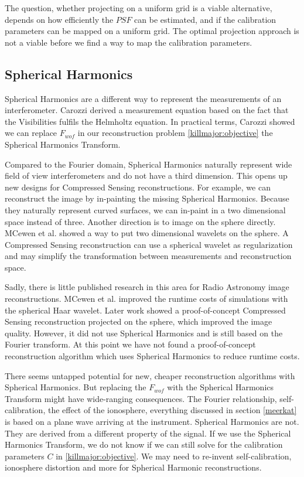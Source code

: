 The question, whether projecting on a uniform grid is a viable alternative, depends on how efficiently the $PSF$ can be estimated, and if the calibration parameters can be mapped on a uniform grid. The optimal projection approach is not a viable before we find a way to map the calibration parameters.


\subsection{Spherical Harmonics}
Spherical Harmonics are a different way to represent the measurements of an interferometer. Carozzi\cite{carozzi2015imaging} derived a measurement equation based on the fact that the Visibilities fulfils the Helmholtz equation. In practical terms, Carozzi showed we can replace $F_{wof}$ in our reconstruction problem \eqref{killmajor:objective} the Spherical Harmonics Transform. 

Compared to the Fourier domain, Spherical Harmonics naturally represent wide field of view interferometers and do not have a third dimension. This opens up new designs for Compressed Sensing reconstructions. For example, we can reconstruct the image by in-painting the missing Spherical Harmonics. Because they naturally represent curved surfaces, we can in-paint in a two dimensional space instead of three. Another direction is to image on the sphere directly. MCewen et al.\cite{mcewen2008simulating} showed a way to put two dimensional wavelets on the sphere. A Compressed Sensing reconstruction can use a spherical wavelet as regularization and may simplify the transformation between measurements and reconstruction space.

Sadly, there is little published research in this area for Radio Astronomy image reconstructions. MCewen et al.\cite{mcewen2008simulating} improved the runtime costs of simulations with the spherical Haar wavelet. Later work\cite{mcewen2011compressed} showed a proof-of-concept Compressed Sensing reconstruction projected on the sphere, which improved the image quality. However, it did not use Spherical Harmonics and \cite{mcewen2011compressed} is still based on the Fourier transform. At this point we have not found a proof-of-concept reconstruction algorithm which uses Spherical Harmonics to reduce runtime costs. 

There seems untapped potential for new, cheaper reconstruction algorithms with Spherical Harmonics. But replacing the $F_{wof}$ with the Spherical Harmonics Transform might have wide-ranging consequences. The Fourier relationship, self-calibration, the effect of the ionosphere, everything discussed in section \ref{meerkat} is based on a plane wave arriving at the instrument\cite{thompson1986interferometry, smirnov2011revisiting}. Spherical Harmonics are not. They are derived from a different property of the signal. If we use the Spherical Harmonics Transform, we do not know if we can still solve for the calibration parameters $C$ in \eqref{killmajor:objective}. We may need to re-invent self-calibration, ionosphere distortion and more for Spherical Harmonic reconstructions.


